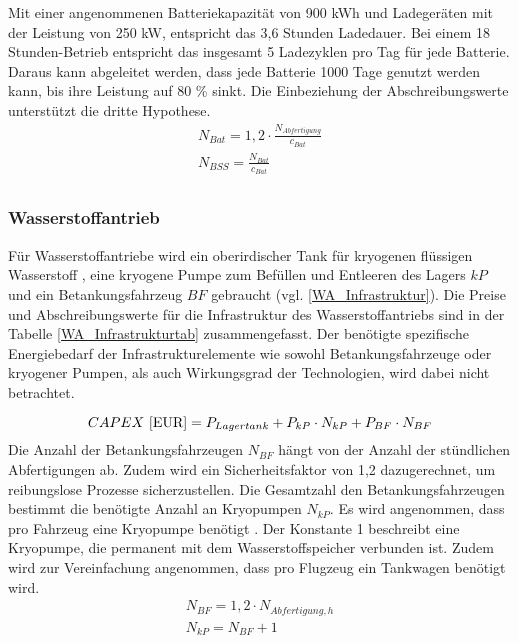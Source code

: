 Mit einer angenommenen Batteriekapazität von 900 kWh und Ladegeräten 
mit der Leistung von 250 kW, entspricht das 3,6 Stunden Ladedauer.
Bei einem 18 Stunden-Betrieb entspricht das insgesamt 5 Ladezyklen pro Tag für jede Batterie. %
Daraus kann abgeleitet werden, dass jede Batterie 1000 Tage genutzt werden kann,
bis ihre Leistung auf 80 \% sinkt.
Die Einbeziehung der Abschreibungswerte unterstützt die dritte Hypothese.
%
\begin{equation}
   \begin{split}
  {N_{Bat}} = {1,2} \cdot \frac{N_{Abfertigung}}{c_{Bat}}\\
   {N_{BSS}} = \frac{N_{Bat}}{c_{Bat}}\\
   \label{BatInfrAnzahl}
    \end{split}
   \end{equation}
%
\subsubsection{Wasserstoffantrieb}
%

Für Wasserstoffantriebe wird ein oberirdischer Tank für kryogenen flüssigen Wasserstoff , 
eine kryogene Pumpe zum Befüllen und Entleeren des Lagers ${kP}$ 
und ein Betankungsfahrzeug ${BF}$ gebraucht (vgl. \eqref{WA_Infrastruktur}). 
Die Preise und Abschreibungswerte für die Infrastruktur des Wasserstoffantriebs 
sind in der Tabelle \ref{WA_Infrastrukturtab} zusammengefasst. 
%
Der benötigte spezifische Energiebedarf der Infrastrukturelemente wie sowohl Betankungsfahrzeuge 
oder kryogener Pumpen, als auch Wirkungsgrad der Technologien, wird dabei nicht betrachtet.

\begin{equation}
   {CAPEX ~[\text{EUR}]} = {P_{Lagertank}} + P_{kP} \cdot N_{kP} + P_{BF} \cdot N_{BF}  \\
   \label{WA_Infrastruktur}
\end{equation}
%
Die Anzahl der Betankungsfahrzeugen $N_{BF}$ hängt von der Anzahl der stündlichen Abfertigungen ab. 
Zudem wird ein Sicherheitsfaktor
von 1,2 dazugerechnet, um reibungslose Prozesse sicherzustellen.
Die Gesamtzahl den Betankungsfahrzeugen bestimmt die benötigte Anzahl an Kryopumpen $N_{kP}$. 
Es wird angenommen, dass pro Fahrzeug eine Kryopumpe benötigt \cite{}.
Der Konstante 1 beschreibt eine Kryopumpe,
die permanent mit dem Wasserstoffspeicher verbunden ist.
Zudem wird zur Vereinfachung angenommen, dass pro Flugzeug ein Tankwagen benötigt wird.
\begin{equation}
   \begin{split}
   {N_{BF}} = {1,2} \cdot {N_{Abfertigung,h}}\\
   {N_{kP}} = N_{BF} + 1 \\
   \label{WAInfrAnzahl}
   \end{split}
   \end{equation}

